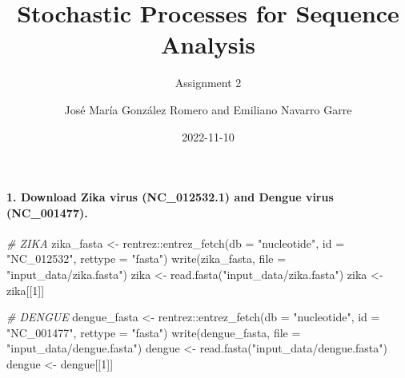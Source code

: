 \documentclass[
]{article}
\title{\textbf{Stochastic Processes for Sequence Analysis}}
\subtitle{Assignment 2}
\author{José María González Romero and Emiliano Navarro Garre}
\date{2022-11-10}
\newenvironment{Shaded}{\begin{snugshade}}{\end{snugshade}}
\newcommand{\AttributeTok}[1]{\textcolor[rgb]{0.77,0.63,0.00}{#1}}
\newcommand{\CommentTok}[1]{\textcolor[rgb]{0.56,0.35,0.01}{\textit{#1}}}
\newcommand{\DecValTok}[1]{\textcolor[rgb]{0.00,0.00,0.81}{#1}}
\newcommand{\FunctionTok}[1]{\textcolor[rgb]{0.00,0.00,0.00}{#1}}
\newcommand{\NormalTok}[1]{#1}
\newcommand{\OtherTok}[1]{\textcolor[rgb]{0.56,0.35,0.01}{#1}}
\newcommand{\SpecialCharTok}[1]{\textcolor[rgb]{0.00,0.00,0.00}{#1}}
\newcommand{\StringTok}[1]{\textcolor[rgb]{0.31,0.60,0.02}{#1}}
\begin{document}
\maketitle

\hypertarget{download-zika-virus-nc_012532.1-and-dengue-virus-nc_001477.}{%
\paragraph{1. Download Zika virus (NC\_012532.1) and Dengue virus
(NC\_001477).}\label{download-zika-virus-nc_012532.1-and-dengue-virus-nc_001477.}}

\begin{Shaded}
\begin{Highlighting}[]
\CommentTok{\# ZIKA}
\NormalTok{zika\_fasta }\OtherTok{\textless{}{-}}\NormalTok{ rentrez}\SpecialCharTok{::}\FunctionTok{entrez\_fetch}\NormalTok{(}\AttributeTok{db =} \StringTok{"nucleotide"}\NormalTok{,}
\AttributeTok{id =} \StringTok{"NC\_012532"}\NormalTok{,}
\AttributeTok{rettype =} \StringTok{"fasta"}\NormalTok{)}
\FunctionTok{write}\NormalTok{(zika\_fasta,}
\AttributeTok{file =} \StringTok{"input\_data/zika.fasta"}\NormalTok{)}
\NormalTok{zika }\OtherTok{\textless{}{-}} \FunctionTok{read.fasta}\NormalTok{(}\StringTok{"input\_data/zika.fasta"}\NormalTok{)}
\NormalTok{zika }\OtherTok{\textless{}{-}}\NormalTok{ zika[[}\DecValTok{1}\NormalTok{]]}

\CommentTok{\# DENGUE}
\NormalTok{dengue\_fasta }\OtherTok{\textless{}{-}}\NormalTok{ rentrez}\SpecialCharTok{::}\FunctionTok{entrez\_fetch}\NormalTok{(}\AttributeTok{db =} \StringTok{"nucleotide"}\NormalTok{,}
\AttributeTok{id =} \StringTok{"NC\_001477"}\NormalTok{,}
\AttributeTok{rettype =} \StringTok{"fasta"}\NormalTok{)}
\FunctionTok{write}\NormalTok{(dengue\_fasta,}
\AttributeTok{file =} \StringTok{"input\_data/dengue.fasta"}\NormalTok{)}
\NormalTok{dengue }\OtherTok{\textless{}{-}} \FunctionTok{read.fasta}\NormalTok{(}\StringTok{"input\_data/dengue.fasta"}\NormalTok{)}
\NormalTok{dengue }\OtherTok{\textless{}{-}}\NormalTok{ dengue[[}\DecValTok{1}\NormalTok{]]}
\end{Highlighting}
\end{Shaded}
\end{document}
